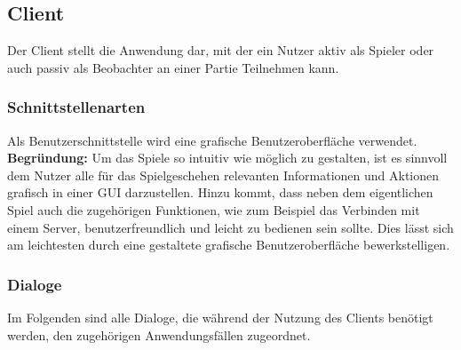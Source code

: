 \subsection{Client}
Der Client stellt die Anwendung dar, mit der ein Nutzer aktiv als Spieler oder auch passiv als Beobachter an einer Partie Teilnehmen kann.

\subsubsection{Schnittstellenarten}
Als Benutzerschnittstelle wird eine grafische Benutzeroberfläche verwendet. \\ \textbf{Begründung:} Um das Spiele so intuitiv wie möglich zu gestalten, ist es sinnvoll dem Nutzer alle für das Spielgeschehen relevanten Informationen und Aktionen grafisch in einer GUI darzustellen. Hinzu kommt, dass neben dem eigentlichen Spiel auch die zugehörigen Funktionen, wie zum Beispiel das Verbinden mit einem Server, benutzerfreundlich und leicht zu bedienen sein sollte. Dies lässt sich am leichtesten durch eine gestaltete grafische Benutzeroberfläche bewerkstelligen.

\newpage

\subsubsection{Dialoge}
Im Folgenden sind alle Dialoge, die während der Nutzung des Clients benötigt werden, den zugehörigen Anwendungsfällen zugeordnet. 

